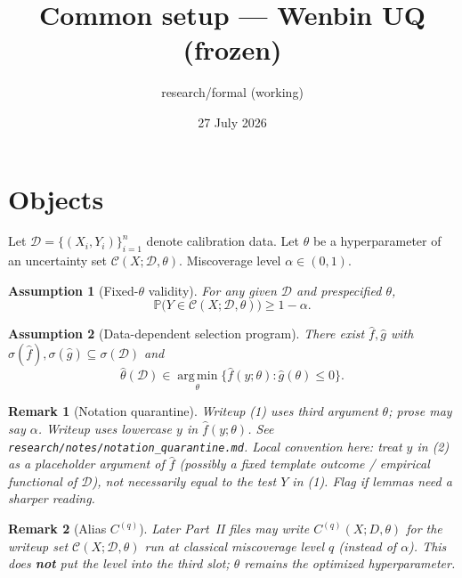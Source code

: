 \documentclass[11pt]{article}
\title{Common setup --- Wenbin UQ (frozen)}
\author{research/formal (working)}
\date{27 July 2026}
\newtheorem{assumption}{Assumption}
\newtheorem{remark}{Remark}
\begin{document}
\maketitle

\section{Objects}
Let $\mathcal{D}=\{(X_i,Y_i)\}_{i=1}^n$ denote calibration data.
Let $\theta$ be a hyperparameter of an uncertainty set
$\mathcal{C}(X;\mathcal{D},\theta)$.
Miscoverage level $\alpha\in(0,1)$.

\begin{assumption}[Fixed-$\theta$ validity]
For any given $\mathcal{D}$ and \emph{prespecified} $\theta$,
\begin{equation}
\mathbb{P}\bigl(Y\in\mathcal{C}(X;\mathcal{D},\theta)\bigr)\ge 1-\alpha.
\tag{1}
\end{equation}
\end{assumption}

\begin{assumption}[Data-dependent selection program]
There exist $\hat f,\hat g$ with $\sigma(\hat f),\sigma(\hat g)\subseteq\sigma(\mathcal{D})$ and
\begin{equation}
\hat\theta(\mathcal{D})
\in
\operatorname*{arg\,min}_{\theta}
\bigl\{\hat f(y;\theta):\hat g(\theta)\le 0\bigr\}.
\tag{2}
\end{equation}
\end{assumption}

\begin{remark}[Notation quarantine]
Writeup (1) uses third argument $\theta$; prose may say $\alpha$.
Writeup uses lowercase $y$ in $\hat f(y;\theta)$.
See \texttt{research/notes/notation\_quarantine.md}.
Local convention here: treat $y$ in (2) as a placeholder argument of $\hat f$
(possibly a fixed template outcome / empirical functional of $\mathcal{D}$),
not necessarily equal to the test $Y$ in (1). Flag if lemmas need a sharper reading.
\end{remark}

\begin{remark}[Alias $C^{(q)}$]
Later Part~II files may write $C^{(q)}(X;D,\theta)$ for the writeup set
$\mathcal{C}(X;\mathcal{D},\theta)$ run at classical miscoverage level $q$
(instead of $\alpha$). This does \textbf{not} put the level into the third slot;
$\theta$ remains the optimized hyperparameter.
\end{remark}
\end{document}
